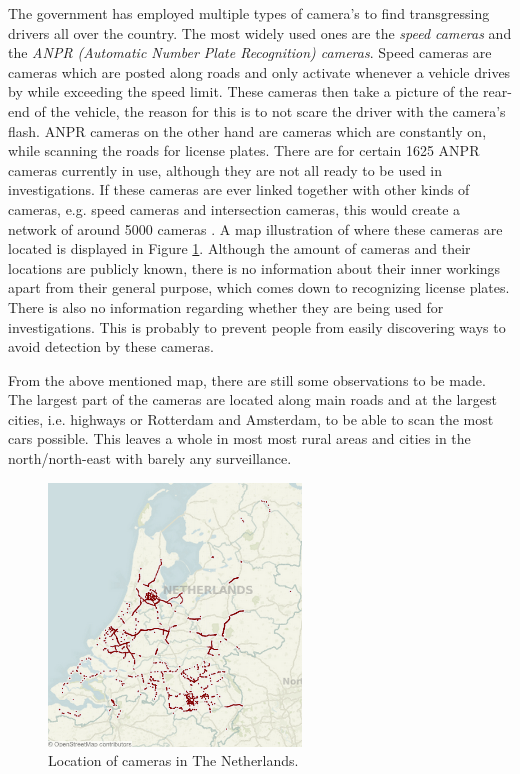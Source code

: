 The government has employed multiple types of camera's to find transgressing drivers all over the country. The most widely used ones are the \emph{speed cameras} and the \emph{ANPR (Automatic Number Plate Recognition) cameras}. Speed cameras are cameras which are posted along roads and only activate whenever a vehicle drives by while exceeding the speed limit. These cameras then take a picture of the rear-end of the vehicle, the reason for this is to not scare the driver with the camera's flash. ANPR cameras on the other hand are cameras which are constantly on, while scanning the roads for license plates.  There are for certain 1625 ANPR cameras \cite{anpr-cameras} currently in use, although they are not all ready to be used in investigations. If these cameras are ever linked together with other kinds of cameras, e.g. speed cameras and intersection cameras, this would create a network of around 5000 cameras \cite{speed-cameras}. A map illustration of where these cameras are located is displayed in Figure \ref{fig:cameras-netherlands}. Although the amount of cameras and their locations are publicly known, there is no information about their inner workings apart from their general purpose, which comes down to recognizing license plates. There is also no information regarding whether they are being used for investigations. This is probably to prevent people from easily discovering ways to avoid detection by these cameras.

From the above mentioned map, there are still some observations to be made. The largest part of the cameras are located along main roads and at the largest cities, i.e. highways or Rotterdam and Amsterdam, to be able to scan the most cars possible. This leaves a whole in most most rural areas and cities in the north/north-east with barely any surveillance.

\begin{figure}[ht]
    \centering
    \includegraphics[width=0.6\textwidth]{plaatjes/anpr-cameras}
    \caption{Location of cameras in The Netherlands.}
    \label{fig:cameras-netherlands}
\end{figure}%

